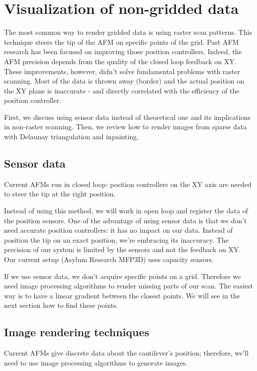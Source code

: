 \chapter{Visualization of non-gridded data}

The most common way to render gridded data is using raster scan patterns. This technique steers the tip of the AFM on specific points of the grid. Past AFM research has been focused on improving those position controllers. Indeed, the AFM precision depends from the quality of the closed loop feedback on XY. These improvements, however, didn't solve fundamental problems with raster scanning. Most of the data is thrown away (border) and the actual position on the XY plane is inaccurate - and directly correlated with the efficiency of the position controller.

First, we discuss using sensor data instead of theoretical one and its implications in non-raster scanning. Then, we review how to render images from sparse data with Delaunay triangulation and inpainting. 

\section{Sensor data}
 
Current AFMs run in closed loop: position controllers on the XY axis are needed to steer the tip at the right position. 

Instead of using this method, we will work in open loop and register the data of the position sensors. One of the advantage of using sensor data is that we don't need accurate position controllers: it has no impact on our data. Instead of position the tip on an exact position, we're embracing its inaccuracy. The precision of our system is limited by the sensors and not the feedback on XY. Our current setup (Asylum Research MFP3D) uses capacity sensors.

If we use sensor data, we don't acquire specific points on a grid. Therefore we need image processing algorithms to render missing parts of our scan.  The easiest way is to have a linear gradient between the closest points. We will see in the next section how to find these points. 

\section{Image rendering techniques}

Current AFMs give discrete data about the cantilever's position; therefore, we'll need to use image processing algorithms to generate images. 

